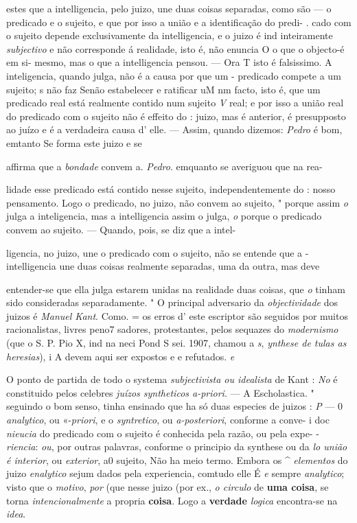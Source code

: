 \textbar{} estes que a intelligencia, pelo juizo, une duas coisas separadas, como são --- o predicado e o sujeito, e que por isso a união e a identificação do predi- . cado com o sujeito depende exclusivamente da intelligencia, e o juizo é ind inteiramente \emph{subjectivo} e não corresponde á realidade, isto é, não enuncia O o que o objecto-é em si- mesmo, mas o que a intelligencia pensou. --- Ora T isto é falsissimo. A inteligencia, quando julga, não é a causa por que um - predicado compete a um sujeito; s não faz Senão estabelecer e ratificar uM nm facto, isto é, que um predicado real está realmente contido num sujeito \emph{V} real; e por isso a união real do predicado com o sujeito não é effeito do : juizo, mas é anterior, é presupposto ao juízo e é a verdadeira causa d' elle. --- Assim, quando dizemos: \emph{Pedro} é bom, emtanto Se forma este juizo e se

affirma que a \emph{bondade} convem a. \emph{Pedro}. emquanto se averiguou que na rea-

lidade esse predicado está contido nesse sujeito, independentemente do : nosso pensamento. Logo o predicado, no juizo, não convem ao sujeito, " porque assim \emph{o} julga a inteligencia, mas a intelligencia assim o julga, \emph{o} porque o predicado convem ao sujeito. --- Quando, pois, se diz que a intel-

ligencia, no juizo, une o predicado com o sujeito, não se entende que a - intelligencia une duas coisas realmente separadas, uma da outra, mas deve

entender-se que ella julga estarem unidas na realidade duas coisas, que \emph{o} tinham sido consideradas separadamente. " O principal adversario da \emph{objectividade} dos juizos é \emph{Manuel Kant}. Como. = os erros d' este escriptor são seguidos por muitos racionalistas, livres peno7 sadores, protestantes, pelos sequazes do \emph{modernismo} (que o S. P. Pio X, ind na neci Pond S sei. 1907, chamou a \emph{s}, \emph{ynthese de tulas as heresias}), i A devem aqui ser expostos e e refutados. \emph{e}

O ponto de partida de todo o systema \emph{subjectivista ou idealista} de Kant : \emph{No} é constituido pelos celebres \emph{juízos syntheticos a-priori}. --- A Escholastica. " seguindo o bom senso, tinha ensinado que ha só duas especies de juizos : \emph{P} --- 0 \emph{analytico}, ou «-\emph{priori}, e o \emph{syntretico}, ou \emph{a-posteriori}, conforme a conve- i doc \emph{nieucia} do predicado com o sujeito é conhecida pela razão, ou pela expe- - \textbar{} \emph{riencia}: \emph{ou}, por outras palavras, conforme o principio da synthese ou da \emph{lo união é interior}, ou \emph{exterior}, a0 sujeito, Não ha meio termo. Embora os \textbar{}\textasciicircum{} \emph{elementos} do juizo \emph{enalytico} sejum dados pela experiencia, comtudo elle É \emph{e} sempre \emph{analytico}; visto que o \emph{motivo}, \emph{por} (que nesse juizo (por ex., \emph{o circulo}   de \textbf{uma coisa}, se torna \emph{intencionalmente} a propria \textbf{coisa}. Logo a \textbf{verdade} \emph{logica} encontra-se na \emph{idea}.

